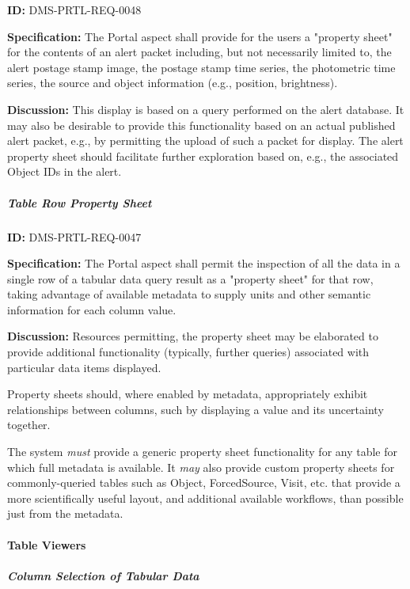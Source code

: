 \documentclass[SE,toc,lsstdraft]{lsstdoc}
\begin{document}
\label{DMS-PRTL-REQ-0048}
\textbf{ID:} DMS-PRTL-REQ-0048

\textbf{Specification:}
The Portal aspect shall provide for the users a "property sheet" for the contents of an alert packet including, but not necessarily limited to, the alert postage stamp image, the postage stamp time series, the photometric time series, the source and object information (e.g., position, brightness).

\textbf{Discussion:}
This display is based on a query performed on the alert database.  It may also be desirable to provide this functionality based on an actual published alert packet, e.g., by permitting the upload of such a packet for display.
The alert property sheet should facilitate further exploration based on, e.g., the associated Object IDs in the alert.

\subparagraph{Table Row Property Sheet}\hfill  %

\label{DMS-PRTL-REQ-0047}
\textbf{ID:} DMS-PRTL-REQ-0047

\textbf{Specification:}
The Portal aspect shall permit the inspection of all the data in a single row of a tabular data query result as a "property sheet" for that row, taking advantage of available metadata to supply units and other semantic information for each column value.

\textbf{Discussion:}
Resources permitting, the property sheet may be elaborated to provide additional functionality (typically, further queries) associated with particular data items displayed.

Property sheets should, where enabled by metadata, appropriately exhibit relationships between columns, such by displaying a value and its uncertainty together.

The system \textit{must} provide a generic property sheet functionality for any table for which full metadata is available. It \textit{may} also provide custom property sheets for commonly-queried tables such as Object, ForcedSource, Visit, etc. that provide a more scientifically useful layout, and additional available workflows, than possible just from the metadata.

\paragraph{Table Viewers}\hfill  %

\subparagraph{Column Selection of Tabular Data}\hfill  %
\end{document}
